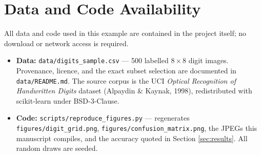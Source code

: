 \section*{Data and Code Availability}

All data and code used in this example are contained in the project itself; no
download or network access is required.

\begin{itemize}
  \item \textbf{Data:} \texttt{data/digits\_sample.csv} --- 500 labelled
    $8\times8$ digit images. Provenance, licence, and the exact subset
    selection are documented in \texttt{data/README.md}. The source corpus is
    the UCI \emph{Optical Recognition of Handwritten Digits} dataset
    (Alpaydin \& Kaynak, 1998), redistributed with scikit-learn under
    BSD-3-Clause.
  \item \textbf{Code:} \texttt{scripts/reproduce\_figures.py} --- regenerates
    \texttt{figures/digit\_grid.png}, \texttt{figures/confusion\_matrix.png},
    the JPEGs this manuscript compiles, and the accuracy quoted in Section
    \ref{sec:results}. All random draws are seeded.
\end{itemize}

